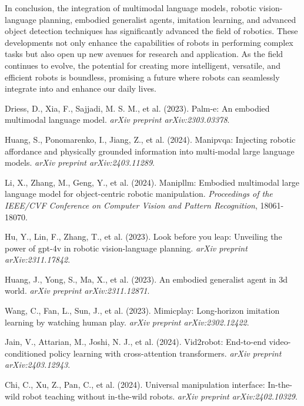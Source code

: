 \documentclass[a4paper]{article}
\begin{document}
In conclusion, the integration of multimodal language models, robotic vision-language planning, embodied generalist agents, imitation learning, and advanced object detection techniques has significantly advanced the field of robotics. These developments not only enhance the capabilities of robots in performing complex tasks but also open up new avenues for research and application. As the field continues to evolve, the potential for creating more intelligent, versatile, and efficient robots is boundless, promising a future where robots can seamlessly integrate into and enhance our daily lives.
\begin{thebibliography}{99}
 Driess, D., Xia, F., Sajjadi, M. S. M., et al. (2023). Palm-e: An embodied multimodal language model. \textit{arXiv preprint arXiv:2303.03378}.

 Huang, S., Ponomarenko, I., Jiang, Z., et al. (2024). Manipvqa: Injecting robotic affordance and physically grounded information into multi-modal large language models. \textit{arXiv preprint arXiv:2403.11289}.

 Li, X., Zhang, M., Geng, Y., et al. (2024). Manipllm: Embodied multimodal large language model for object-centric robotic manipulation. \textit{Proceedings of the IEEE/CVF Conference on Computer Vision and Pattern Recognition}, 18061-18070.

 Hu, Y., Lin, F., Zhang, T., et al. (2023). Look before you leap: Unveiling the power of gpt-4v in robotic vision-language planning. \textit{arXiv preprint arXiv:2311.17842}.

 Huang, J., Yong, S., Ma, X., et al. (2023). An embodied generalist agent in 3d world. \textit{arXiv preprint arXiv:2311.12871}.

 Wang, C., Fan, L., Sun, J., et al. (2023). Mimicplay: Long-horizon imitation learning by watching human play. \textit{arXiv preprint arXiv:2302.12422}.

 Jain, V., Attarian, M., Joshi, N. J., et al. (2024). Vid2robot: End-to-end video-conditioned policy learning with cross-attention transformers. \textit{arXiv preprint arXiv:2403.12943}.

 Chi, C., Xu, Z., Pan, C., et al. (2024). Universal manipulation interface: In-the-wild robot teaching without in-the-wild robots. \textit{arXiv preprint arXiv:2402.10329}.


\end{thebibliography}
\end{document}
